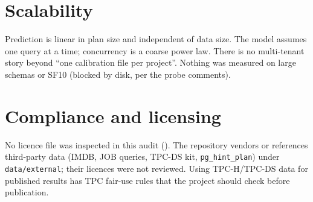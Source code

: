 \section{Scalability}
Prediction is linear in plan size and independent of data size. The model assumes one query at a time; concurrency is a coarse power law. There is no multi-tenant story beyond ``one calibration file per project''. Nothing was measured on large schemas or SF10 (blocked by disk, per the probe comments).

\section{Compliance and licensing}
No licence file was inspected in this audit (\evUNK). The repository vendors or references third-party data (IMDB, JOB queries, TPC-DS kit, \texttt{pg\_hint\_plan}) under \texttt{data/external}; their licences were not reviewed. Using TPC-H/TPC-DS data for published results has TPC fair-use rules that the project should check before publication.
